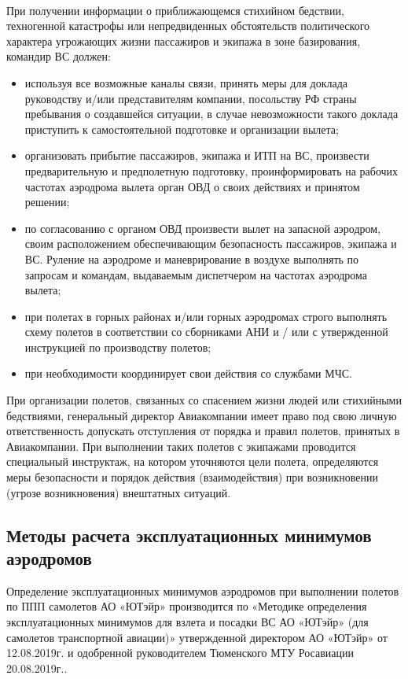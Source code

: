 \paragraph{} При получении информации о приближающемся стихийном бедствии, техногенной катастрофы или непредвиденных обстоятельств политического характера угрожающих жизни пассажиров и экипажа в зоне базирования, командир ВС должен:
\begin{itemize}
    \item используя все возможные каналы связи, принять меры для доклада руководству и/или представителям компании, посольству РФ страны пребывания о создавшейся ситуации, в случае невозможности такого доклада приступить к самостоятельной подготовке и организации вылета;
    \item организовать прибытие пассажиров, экипажа и ИТП на ВС, произвести предварительную и предполетную подготовку, проинформировать на рабочих частотах аэродрома вылета орган ОВД о своих действиях и принятом решении; 
    \item по согласованию с органом ОВД произвести вылет на запасной аэродром, своим расположением 
    обеспечивающим безопасность пассажиров, экипажа и ВС. Руление на аэродроме и маневрирование в воздухе выполнять по запросам и командам, выдаваемым диспетчером на частотах аэродрома вылета;
    \item при полетах в горных районах и/или горных аэродромах строго выполнять схему полетов в соответствии со сборниками АНИ и / или с утвержденной инструкцией по производству полетов; 
    \item при необходимости координирует свои действия со службами МЧС.
\end{itemize}

При организации полетов, связанных со спасением жизни людей или стихийными бедствиями, генеральный директор Авиакомпании имеет право под свою личную ответственность допускать отступления от порядка и правил полетов, принятых в Авиакомпании. При выполнении таких полетов с экипажами проводится специальный инструктаж, на котором уточняются цели полета, определяются меры безопасности и порядок действия (взаимодействия) при возникновении (угрозе возникновения) внештатных ситуаций.

\subsection{Методы расчета эксплуатационных минимумов аэродромов}

Определение эксплуатационных минимумов аэродромов при выполнении полетов по ППП самолетов АО «ЮТэйр» производится по «Методике определения эксплуатационных минимумов для взлета и посадки ВС АО «ЮТэйр» (для самолетов транспортной авиации)» утвержденной директором АО «ЮТэйр» от 12.08.2019г. и одобренной руководителем Тюменского МТУ Росавиации 20.08.2019г..

